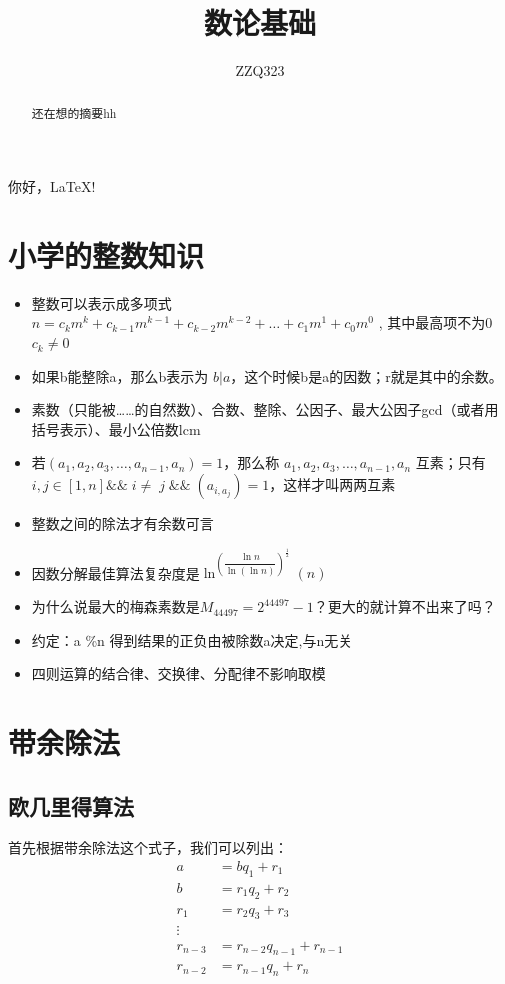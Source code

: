 \documentclass[12pt]{article}
\title{数论基础}
\author{ZZQ323}
\begin{document}
\maketitle

\tableofcontents

\begin{abstract}
    还在想的摘要hh
\end{abstract}
你好，LaTeX!

\section{小学的整数知识}


\begin{itemize}
    \item 整数可以表示成多项式 $n = c_{k}m^{k} + c_{k-1}m^{k-1} + c_{k-2}m^{k-2} +\dots+ c_{1}m^{1} + c_{0}m^{0}$ , 其中最高项不为0 $c_{k}\neq0$
    \item 如果b能整除a，那么b表示为 $b|a$，这个时候b是a的因数；r就是其中的余数。
    \item 素数（只能被……的自然数）、合数、整除、公因子、最大公因子gcd（或者用括号表示）、最小公倍数lcm
    \item 若$(a_{1},a_{2},a_{3},\dots,a_{n-1},a_{n})=1$，那么称 $a_{1},a_{2},a_{3},\dots,a_{n-1},a_{n}$ 互素；只有 $i,j \in [1,n] \&\&\;i\neq\;j\;\&\&\;(a_{i,a_{j}})=1$，这样才叫两两互素
    \item 整数之间的除法才有余数可言
    \item 因数分解最佳算法复杂度是$\ln^{\left(\dfrac{\ln n}{\ln\left(\ln n\right)}\right)^{\tfrac{1}{2}}}(n)$
    \item 为什么说最大的梅森素数是$M_{44497}=2^{44497}-1$？更大的就计算不出来了吗？
    \item 约定：a \%n 得到结果的正负由被除数a决定,与n无关
    \item 四则运算的结合律、交换律、分配律不影响取模
\end{itemize}

\section{带余除法}
\subsection{欧几里得算法}

首先根据带余除法这个式子，我们可以列出：
\begin{align}
    a &= bq_{1} + r_{1} \\
    b &= r_{1}q_{2} + r_{2} \\
    r_{1} &= r_{2}q_{3} + r_{3} \\
    \vdots\nonumber \\
    r_{n-3} &= r_{n-2}q_{n-1} + r_{n-1} \\
    r_{n-2} &= r_{n-1}q_{n} + r_{n}
\end{align}
\end{document}

